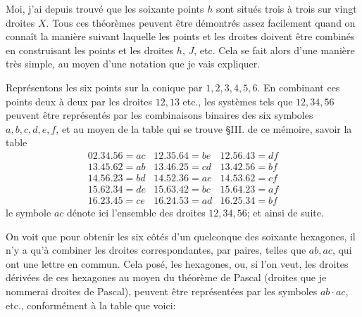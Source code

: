 \documentclass[12pt,a4paper]{article}
\theoremstyle{definition}
\begin{document}
Moi, j'ai depuis trouv\'{e} que les soixante points $h$ sont situ\'{e}s trois \`{a} trois sur vingt droites $X$. Tous ces th\'{e}or\`{e}mes peuvent \^{e}tre d\'{e}montr\'{e}s assez facilement quand on conna\^{i}t la mani\`{e}re suivant laquelle les points et les droites doivent \^{e}tre combin\'{e}s en construisant les points et les droites $h$, $J$, etc. Cela se fait alors d'une mani\`{e}re tr\`{e}s simple, au moyen d'une notation que je vais expliquer.

Repr\'{e}sentons les six points sur la conique par $1, 2, 3, 4, 5, 6$. En combinant ces points deux \`{a} deux par les droites $12, 13$ etc., les syst\`{e}mes tels que $12, 34, 56$ peuvent \^{e}tre repr\'{e}sent\'{e}s par les combinaisons binaires des six symboles $a, b, c, d, e, f$, et au moyen de la table qui se trouve \S III. de ce m\'{e}moire, savoir la table
\begin{equation}\tag{A}
\begin{array}{lll}
02.34.56 = ac & 12.35.64 = be & 12.56.43 = df \\
13.45.62 = ab & 13.46.25 = cd & 13.42.56 = bf \\
14.56.23 = bd & 14.52.36 = ae & 14.53.62 = cf \\
15.62.34 = de & 15.63.42 = bc & 15.64.23 = af \\
16.23.45 = ce & 16.24.53 = ad & 16.25.34 = bf
\end{array}
\end{equation}
le symbole $ac$ d\'{e}note ici l'ensemble des droites $12, 34, 56$; et ainsi de suite.

On voit que pour obtenir les six c\^{o}t\'{e}s d'un quelconque des soixante hexagones, il n'y a qu'\`{a} combiner les droites correspondantes, par paires, telles que $ab, ac$, qui ont une lettre en commun. Cela pos\'{e}, les hexagones, ou, si l'on veut, les droites d\'{e}riv\'{e}es de ces hexagones au moyen du th\'{e}or\`{e}me de Pascal (droites que je nommerai droites de Pascal), peuvent \^{e}tre repr\'{e}sent\'{e}es par les symboles $ab \cdot ac$, etc., conform\'{e}ment \`{a} la table que voici:
\end{document}
